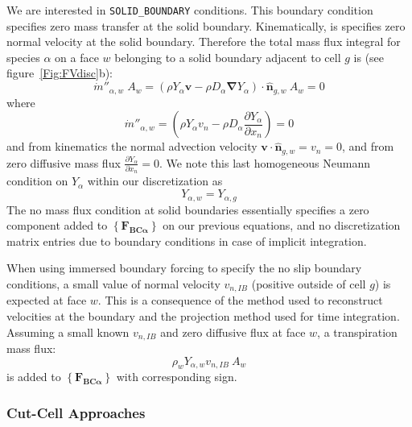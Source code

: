 \documentclass[12pt]{article}
\begin{document}
We are interested in \texttt{SOLID\_BOUNDARY} conditions. This boundary condition specifies zero mass transfer at the solid boundary. Kinematically, is specifies zero normal velocity at the solid boundary. Therefore the total mass flux integral for species $\alpha$ on a face $w$ belonging to a solid boundary adjacent to cell $g$ is (see figure~\ref{Fig:FVdisc}b):
%
\begin{equation}
    \dot{m}''_{\alpha,w} \; A_w = \left( \rho Y_\alpha \mathbf{v} - \rho D_\alpha \boldsymbol{\nabla} Y_\alpha \right) \cdot \hat{\mathbf{n}}_{g,w} \: A_w = 0 \label{eq:fvsolidbc}
\end{equation}
% 
where
\begin{equation}
    \dot{m}''_{\alpha,w} = \left( \rho Y_\alpha v_n - \rho D_\alpha \frac{\partial Y_\alpha}{\partial x_n} \right) = 0 \label{eq:fvsolidbc2}
\end{equation}
and from kinematics the normal advection velocity $\mathbf{v} \cdot \hat{\mathbf{n}}_{g,w}=v_n=0$, and from zero diffusive mass flux $\frac{\partial Y_\alpha}{\partial x_n}=0$. We note this last homogeneous Neumann condition on $Y_\alpha$ within our discretization as 
%
\begin{equation}
   Y_{\alpha,w} = Y_{\alpha,g}
\end{equation}
%
The no mass flux condition at solid boundaries essentially specifies a zero component added to $\left\{ \mathbf{F_{BC \alpha}} \right\}$ on our previous equations, and no discretization matrix entries due to boundary conditions in case of implicit integration.

When using immersed boundary forcing to specify the no slip boundary conditions, a small value of normal velocity $v_{n,IB}$ (positive outside of cell $g$) is expected at face $w$. This is a consequence of the method used to reconstruct velocities at the boundary and the projection method used for time integration. Assuming a small known $v_{n,IB}$ and zero diffusive flux at face $w$, a transpiration mass flux:
%
\begin{equation}
    \rho_w Y_{\alpha,w} v_{n,IB}  \: A_w 
\end{equation}
%
is added to $\left\{ \mathbf{F_{BC \alpha}} \right\}$ with corresponding sign. 





\subsubsection{Cut-Cell Approaches} \label{sec:cc}
\end{document}
